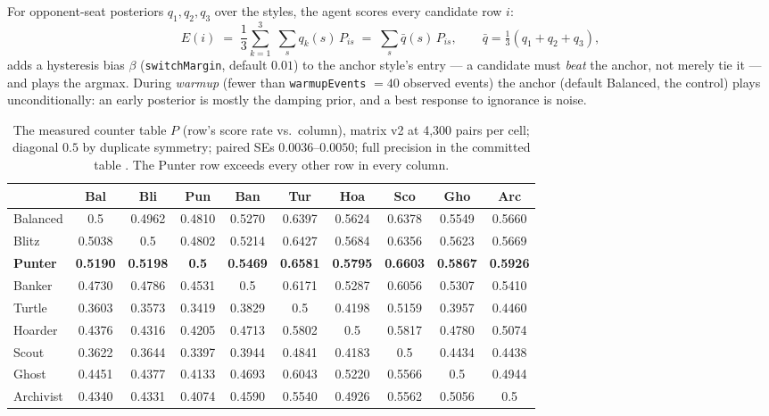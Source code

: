\documentclass[11pt]{article}
\newcommand{\code}[1]{\texttt{#1}}
\begin{document}
For opponent-seat posteriors $q_1, q_2, q_3$ over the styles, the agent scores every
candidate row $i$:
\begin{equation}
\label{eq:expected}
E(i) \;=\; \frac{1}{3}\sum_{k=1}^{3}\;\sum_{s} q_k(s)\, P_{is}
\;=\; \sum_{s} \bar q(s)\, P_{is},
\qquad \bar q = \tfrac{1}{3}(q_1 + q_2 + q_3),
\end{equation}
adds a hysteresis bias $\beta$ (\code{switchMargin}, default $0.01$) to the anchor
style's entry --- a candidate must \emph{beat} the anchor, not merely tie it --- and
plays the argmax. During \emph{warmup} (fewer than \code{warmupEvents} $= 40$ observed
events) the anchor (default Balanced, the control) plays unconditionally: an early
posterior is mostly the damping prior, and a best response to ignorance is noise.

\begin{table}[t]
\centering
\caption{The measured counter table $P$ (row's score rate vs.\ column), matrix v2 at
4{,}300 pairs per cell; diagonal $0.5$ by duplicate symmetry; paired SEs
$0.0036$--$0.0050$; full precision in the committed table \cite{matrixv2}. The Punter row
exceeds every other row in every column.}
\label{tab:counter}
\footnotesize
\setlength{\tabcolsep}{4.4pt}
\begin{tabular}{@{}lccccccccc@{}}
\toprule
 & Bal & Bli & Pun & Ban & Tur & Hoa & Sco & Gho & Arc \\
\midrule
Balanced  & 0.5    & 0.4962 & 0.4810 & 0.5270 & 0.6397 & 0.5624 & 0.6378 & 0.5549 & 0.5660 \\
Blitz     & 0.5038 & 0.5    & 0.4802 & 0.5214 & 0.6427 & 0.5684 & 0.6356 & 0.5623 & 0.5669 \\
\textbf{Punter} & \textbf{0.5190} & \textbf{0.5198} & \textbf{0.5} & \textbf{0.5469} & \textbf{0.6581} & \textbf{0.5795} & \textbf{0.6603} & \textbf{0.5867} & \textbf{0.5926} \\
Banker    & 0.4730 & 0.4786 & 0.4531 & 0.5    & 0.6171 & 0.5287 & 0.6056 & 0.5307 & 0.5410 \\
Turtle    & 0.3603 & 0.3573 & 0.3419 & 0.3829 & 0.5    & 0.4198 & 0.5159 & 0.3957 & 0.4460 \\
Hoarder   & 0.4376 & 0.4316 & 0.4205 & 0.4713 & 0.5802 & 0.5    & 0.5817 & 0.4780 & 0.5074 \\
Scout     & 0.3622 & 0.3644 & 0.3397 & 0.3944 & 0.4841 & 0.4183 & 0.5    & 0.4434 & 0.4438 \\
Ghost     & 0.4451 & 0.4377 & 0.4133 & 0.4693 & 0.6043 & 0.5220 & 0.5566 & 0.5    & 0.4944 \\
Archivist & 0.4340 & 0.4331 & 0.4074 & 0.4590 & 0.5540 & 0.4926 & 0.5562 & 0.5056 & 0.5    \\
\bottomrule
\end{tabular}
\end{table}
\end{document}
